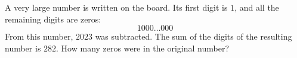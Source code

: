 A very large number is written on the board. Its first digit is $1$, and all the remaining digits are zeros: \[1000\ldots000\]From this number, $2023$ was subtracted. The sum of the digits of the resulting number is $282$. How many zeros were in the original number?
